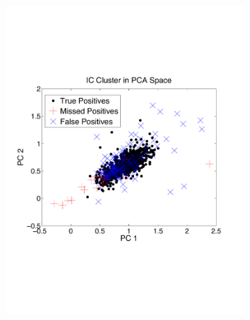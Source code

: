 \begin{center}
\begin{figure}[h!]
\begin{subfigure}[b]{.33\textwidth}
\includegraphics[width=\textwidth]{../figs/new/ICclusteroldpca.pdf}
\caption{}
\label{fig:ICold}
\end{subfigure}
\begin{subfigure}[b]{.33\textwidth}

\end{subfigure}
\end{figure}
\end{center}
